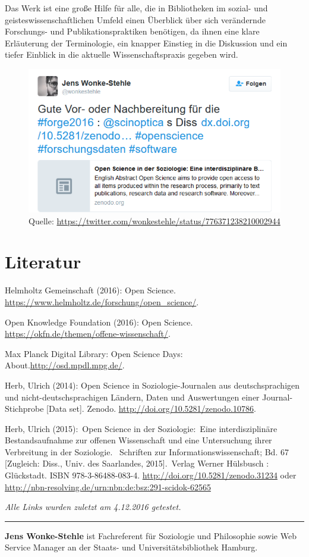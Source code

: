 \documentclass[a4paper,
fontsize=11pt,
oneside,
numbers=noperiodatend,
parskip=half-,
bibliography=totoc,
final
]{scrartcl}
\begin{document}
Das Werk ist eine große Hilfe für alle, die in Bibliotheken im sozial-
und geisteswissenschaftlichen Umfeld einen Überblick über sich
verändernde Forschungs- und Publikationspraktiken benötigen, da ihnen
eine klare Erläuterung der Terminologie, ein knapper Einstieg in die
Diskussion und ein tiefer Einblick in die aktuelle Wissenschaftspraxis
gegeben wird.

\begin{figure}
\centering
\includegraphics{img/abbildung.png}
\caption{Quelle:
\url{https://twitter.com/wonkestehle/status/776371238210002944}}
\end{figure}

\section*{Literatur}\label{literatur}

Helmholtz Gemeinschaft (2016): Open Science.
\url{https://www.helmholtz.de/forschung/open_science/}.

Open Knowledge Foundation (2016): Open Science.
\url{https://okfn.de/themen/offene-wissenschaft/}.

Max Planck Digital Library: Open Science Days:
About.\url{http://osd.mpdl.mpg.de/}.

Herb, Ulrich (2014): Open Science in Soziologie-Journalen aus
deutschsprachigen und nicht-deutschsprachigen Ländern, Daten und
Auswertungen einer Journal-Stichprobe {[}Data set{]}. Zenodo.
\url{http://doi.org/10.5281/zenodo.10786}.

Herb, Ulrich (2015):~Open Science in der Soziologie:~Eine
interdisziplinäre Bestandsaufnahme zur offenen Wissenschaft und eine
Untersuchung ihrer Verbreitung in der Soziologie. ~Schriften zur
Informationswissenschaft; Bd. 67 {[}Zugleich: Diss., Univ. des
Saarlandes, 2015{]}.~Verlag Werner Hülsbusch : Glückstadt. ISBN
978-3-86488-083-4. \url{http://doi.org/10.5281/zenodo.31234} oder
\url{http://nbn-resolving.de/urn:nbn:de:bsz:291-scidok-62565}

\emph{Alle Links wurden zuletzt am 4.12.2016 getestet.}

\begin{center}\rule{0.5\linewidth}{\linethickness}\end{center}

\textbf{Jens Wonke-Stehle} ist Fachreferent für Soziologie und
Philosophie sowie Web Service Manager an der Staats- und
Universitätsbibliothek Hamburg.
\end{document}
